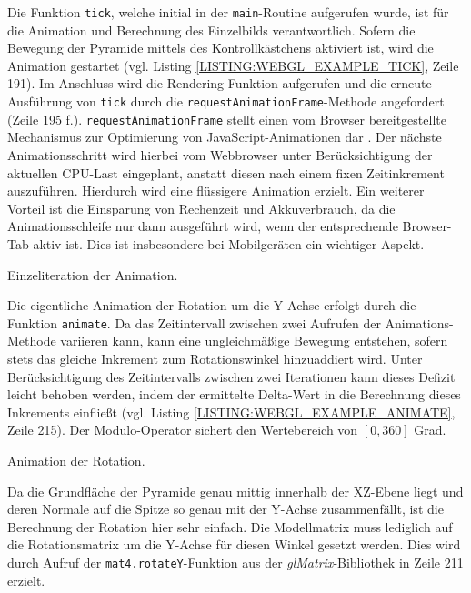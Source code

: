 Die Funktion \texttt{tick}, welche initial in der \texttt{main}-Routine aufgerufen wurde, ist für die Animation und Berechnung des Einzelbilds verantwortlich. Sofern die Bewegung der Pyramide mittels des Kontrollkästchens aktiviert ist, wird die Animation gestartet (vgl. Listing \ref{LISTING:WEBGL_EXAMPLE_TICK}, Zeile 191). Im Anschluss wird die Rendering-Funktion aufgerufen und die erneute Ausführung von \texttt{tick} durch die \texttt{requestAnimationFrame}-Methode angefordert (Zeile 195 f.).
\texttt{requestAnimationFrame} stellt einen vom Browser bereitgestellte Mechanismus zur Optimierung von JavaScript-Animationen dar \autocite{OPERA_REQUEST_ANIMATION_FRAME}. Der nächste Animationsschritt wird hierbei vom Webbrowser unter Berücksichtigung der aktuellen CPU-Last eingeplant, anstatt diesen nach einem fixen Zeitinkrement auszuführen. Hierdurch wird eine flüssigere Animation erzielt. Ein weiterer Vorteil ist die Einsparung von Rechenzeit und Akkuverbrauch, da die Animationsschleife nur dann ausgeführt wird, wenn der entsprechende Browser-Tab aktiv ist. Dies ist insbesondere bei Mobilgeräten ein wichtiger Aspekt.

\smallskip
\begin{listing}[!htb]
\caption{Einzeliteration der Animation.}
\label{LISTING:WEBGL_EXAMPLE_TICK}
\end{listing}

Die eigentliche Animation der Rotation um die Y-Achse erfolgt durch die Funktion \texttt{animate}. Da das Zeitintervall zwischen zwei Aufrufen der Animations-Methode variieren kann, kann eine ungleichmäßige Bewegung entstehen, sofern stets das gleiche Inkrement zum Rotationswinkel hinzuaddiert wird. Unter Berücksichtigung des Zeitintervalls zwischen zwei Iterationen kann dieses Defizit leicht behoben werden, indem der ermittelte Delta-Wert in die Berechnung dieses Inkrements einfließt (vgl. Listing \ref{LISTING:WEBGL_EXAMPLE_ANIMATE}, Zeile 215). Der Modulo-Operator sichert den Wertebereich von $[0, 360]$ Grad.

\smallskip
\begin{listing}[!htb]
\caption{Animation der Rotation.}
\label{LISTING:WEBGL_EXAMPLE_ANIMATE}
\end{listing}

Da die Grundfläche der Pyramide genau mittig innerhalb der XZ-Ebene liegt und deren Normale auf die Spitze so genau mit der Y-Achse zusammenfällt, ist die Berechnung der Rotation hier sehr einfach. Die Modellmatrix muss lediglich auf die Rotationsmatrix um die Y-Achse für diesen Winkel gesetzt werden. Dies wird durch Aufruf der \texttt{mat4.rotateY}-Funktion aus der \emph{glMatrix}-Bibliothek in Zeile 211 erzielt.

